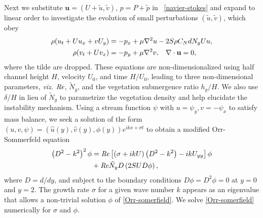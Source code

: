 \documentclass{jfm}
\newcommand{\bu}{\mathbf{u}}
\newcommand{\hg}{h_g}
\newcommand{\Ndg}{\tilde{N}_g}
\begin{document}
Next we substitute $\bu = (U+\tilde{u}, \tilde{v})$, $p=P+\tilde{p}$ in ~\eqref{navier-stokes} and expand to linear order to investigate the evolution of small perturbations $(\tilde{u}, \tilde{v})$, which obey
\begin{equation}
\begin{split}
\rho(u_t+U u_x+vU_y) &= -p_x+ {\mu}\nabla^2u-2S\rho C_{N}dN_{g}Uu, \\
\rho(v_t+ Uv_x) &= -p_y+ {\mu}\nabla^2v, \hspace{0.3cm} \nabla\cdot\bu=0,
\end{split} \nonumber
\end{equation}
where the tilde are dropped.
These equations are non-dimensionalized using half channel height $H$, velocity $U_0$, and time $H/U_0$, leading to three non-dimensional parameters, \textit{viz.} $\mbox{\textit{Re}}$, $\Ndg$, and the vegetation submergence ratio $\hg/H$. 
We also use $\delta/H$ in lieu of $\Ndg$ to parametrize the vegetation density and help elucidate the instability mechanism. 
Using a stream function $\psi$ with $u = \psi_{y}, v= -\psi_x$ to satisfy mass balance, we seek a solution of 
the form $\left(u,v,\psi \right)= \left(\hat u(y), \hat v(y), \phi(y) \right)e^{ikx+\sigma t}$ to obtain a modified Orr-Sommerfeld equation \cite{Drazin81} 
\begin{equation}
\begin{split}
\left(D^2 -k^{2} \right)^2\phi &= \Rey \left[ \left({\sigma}+ikU\right) \left(D^2-k^2\right) -ikU_{yy}\right]\phi \\
&+\Rey \Ndg D\left(2 S U D \phi\right),
\label{Orr-somerfield}
\end{split}
\end{equation}
where $D=d/dy$, and subject to the boundary conditions $D\phi = D^2\phi = 0$ at $y=0$ and $y=2$. 
The growth rate $\sigma$ for a given wave number $k$ appears as an eigenvalue that allows a non-trivial solution $\phi$ of  \eqref{Orr-somerfield}.
We solve \eqref{Orr-somerfield} numerically for $\sigma$ and $\phi$.
\end{document}

